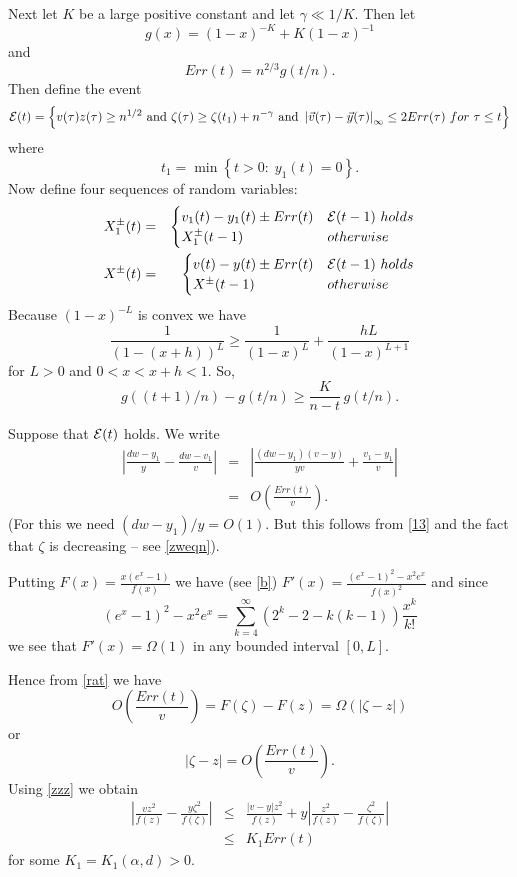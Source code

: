 \documentclass[11pt]{article}
\newcommand{\card}[1]{\left|#1\right|}
\def\cE{{\cal E}}
\def\a{\alpha}
\def\g{\gamma}
\def\z{\zeta}
\def\t{\tau}
\newcommand{\set}[1]{\left\{#1\right\}}
\def\vv{\vec{v}}
\def\yy{\vec{y}}
\newcommand{\brac}[1]{\left(#1\right)}
\newcommand{\bfrac}[2]{\brac{\frac{#1}{#2}}}
\newcommand{\beq}[1]{\begin{equation}\label{#1}}
\newcommand{\eeq}{\end{equation}}
\begin{document}
Next let $K$ be a large positive constant and let $\g\ll 1/K$.
Then let
$$g(x)=(1-x)^{-K}+K(1-x)^{-1}$$
and
$$Err(t)=n^{2/3}g(t/n).$$
Then define the event
$$\cE(t)=\set{v(\t)z(\t)\geq n^{1/2}\text{ and }\z(\t)\geq \z(t_1)+n^{-\g}\text{ and }\card{\vv(\t)-\yy(\t)}_\infty
\leq 2Err(\t)\ for\ \t\leq t}$$
where 
\beq{t1}
t_1=\min\set{t>0:\;y_1(t)=0}.
\eeq
Now define four sequences of random variables: 
\begin{eqnarray*}
X_1^{\pm}(t)&=&\begin{cases}v_1(t)-y_1(t)\pm Err(t)&\cE(t-1)\ holds\\
                X_1^{\pm}(t-1)&otherwise
               \end{cases}\\
X^{\pm}(t)&=&\begin{cases}v(t)-y(t)\pm Err(t)&\cE(t-1)\ holds\\
                X^{\pm}(t-1)&otherwise
               \end{cases}
\end{eqnarray*}
Because $(1-x)^{-L}$ is convex we have 
$$\frac{1}{(1-(x+h))^L}\geq \frac{1}{(1-x)^L}+\frac{hL}{(1-x)^{L+1}}$$
for $L>0$ and $0<x<x+h<1$. So,
\beq{gt}
g((t+1)/n)-g(t/n)\geq \frac{K}{n-t}\,g(t/n).
\eeq

Suppose that $\cE(t)$ holds. We write
\begin{eqnarray}
\card{\frac{dw-y_1}{y}-\frac{dw-v_1}{v}}&=&\card{\frac{(dw-y_1)(v-y)}{yv}+\frac{v_1-y_1}{v}}\nonumber\\
&=&O\bfrac{Err(t)}{v}.\label{rat}
\end{eqnarray}
(For this we need $(dw-y_1)/y=O(1)$. But this follows from \eqref{13} and the fact that $\z$ is decreasing -- see \eqref{zweqn}).

Putting $F(x)=\frac{x(e^x-1)}{f(x)}$ 
we have (see \eqref{b}) $F'(x)=\frac{(e^x-1)^2-x^2e^x}{f(x)^2}$ and since
\beq{diff}
(e^x-1)^2-x^2e^x=\sum_{k=4}^\infty(2^k-2-k(k-1))\frac{x^k}{k!}
\eeq
we see that $F'(x)=\Omega(1)$ in any bounded interval $[0,L]$. 

Hence from \eqref{rat} we have
$$O\bfrac{Err(t)}{v}=F(\z)-F(z)=\Omega(|\z-z|)$$
or
\beq{zzz}
|\z-z|=O\bfrac{Err(t)}{v}.
\eeq
Using \eqref{zzz} we obtain
\begin{eqnarray}
\card{\frac{vz^2}{f(z)}-\frac{y\z^2}{f(\z)}}&\leq&\frac{|v-y|z^2}{f(z)}+y\card{\frac{z^2}{f(z)}-\frac{\z^2}{f(\z)}}\nonumber\\
&\leq &K_1Err(t)\label{plm}
\end{eqnarray}
for some $K_1=K_1(\a,d)>0$.
\end{document}
